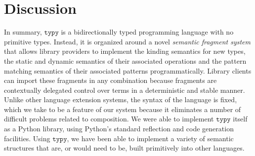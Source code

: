 \documentclass[preprint,10pt]{sigplanconf}
\newcommand{\typy}{\texttt{typy}}
\begin{document}
\section{Discussion}\label{sec:discussion}
In summary, $\typy$ is a bidirectionally typed programming language with no primitive types. Instead, it is organized around a novel \emph{semantic fragment system} that allows library providers to implement the kinding semantics for new types, the static and dynamic semantics of their associated operations and the pattern matching semantics of their associated patterns programmatically. Library clients can import these fragments in any combination because fragments are contextually delegated control over terms in a deterministic and stable manner. Unlike other language extension systems, the syntax of the language is fixed, which we take to be a feature of our system because it eliminates a number of difficult problems related to composition. We were able to implement $\typy$ itself as a Python library, using Python's standard reflection and code generation facilities. Using $\typy$, we have been able to implement a variety of semantic structures that are, or would need to be, built primitively into other languages.


\end{document}
